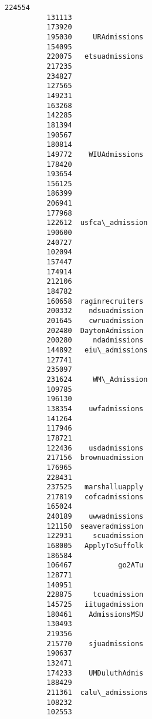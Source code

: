 \documentclass[11pt]{article}
\begin{document}
\begin{Verbatim}[commandchars=\\\{\}]
          224554                   
          131113                   
          173920                   
          195030     URAdmissions  
          154095                   
          220075   etsuadmissions  
          217235                   
          234827                   
          127565                   
          149231                   
          163268                   
          142285                   
          181394                   
          190567                   
          180814                   
          149772    WIUAdmissions  
          178420                   
          193654                   
          156125                   
          186399                   
          206941                   
          177968                   
          122612  usfca\_admission  
          190600                   
          240727                   
          102094                   
          157447                   
          174914                   
          212106                   
          184782                   
          160658  raginrecruiters  
          200332    ndsuadmission  
          201645    cwruadmission  
          202480  DaytonAdmission  
          200280     ndadmissions  
          144892   eiu\_admissions  
          127741                   
          235097                   
          231624     WM\_Admission  
          109785                   
          196130                   
          138354    uwfadmissions  
          141264                   
          117946                   
          178721                   
          122436    usdadmissions  
          217156  brownuadmission  
          176965                   
          228431                   
          237525   marshalluapply  
          217819   cofcadmissions  
          165024                   
          240189    uwwadmissions  
          121150  seaveradmission  
          122931     scuadmission  
          168005   ApplyToSuffolk  
          186584                   
          106467           go2ATu  
          128771                   
          140951                   
          228875     tcuadmission  
          145725   iitugadmission  
          180461    AdmissionsMSU  
          130493                   
          219356                   
          215770    sjuadmissions  
          190637                   
          132471                   
          174233    UMDuluthAdmis  
          188429                   
          211361  calu\_admissions  
          108232                   
          102553                   

\end{Verbatim}
\end{document}
